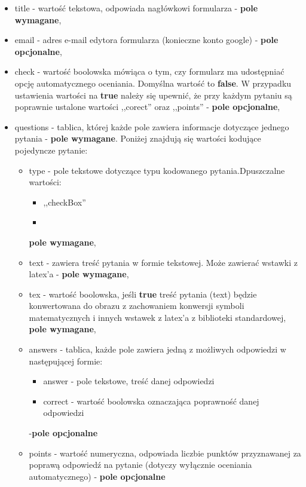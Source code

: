 \begin{itemize}
\item{title} - wartość tekstowa, odpowiada nagłówkowi formularza -  \textbf{pole wymagane},
\item{email} - adres e-mail edytora formularza (konieczne konto google) - \textbf{pole opcjonalne},
\item{check} - wartość boolowska mówiąca o tym, czy formularz ma udostępniać opcję automatycznego oceniania. Domyślna wartość to \textbf{false}. W przypadku ustawienia wartości na \textbf{true} należy się upewnić, że przy każdym pytaniu są poprawnie ustalone wartości ,,corect'' oraz ,,points'' - \textbf{pole opcjonalne},
\item{questions} - tablica, której każde pole zawiera informacje dotyczące jednego pytania - \textbf{pole wymagane}. Poniżej znajdują się wartości kodujące pojedyncze pytanie:
\begin{itemize}
\item{type} - pole tekstowe dotyczące typu kodowanego pytania.Dpuszczalne wartości:
\begin{itemize}
\item ,,checkBox''
\item
\end{itemize}
 \textbf{pole wymagane},
\item{text} - zawiera treść pytania w formie tekstowej. Może zawierać wstawki z latex'a - \textbf{pole wymagane},
\item{tex} - wartość boolowska, jeśli \textbf{true} treść pytania (text) będzie konwertowana do obrazu z zachowaniem konwersji symboli matematycznych i innych wstawek z latex'a z biblioteki standardowej, \textbf{pole wymagane},
\item{answers} - tablica, każde pole zawiera jedną z możliwych odpowiedzi w następującej formie:
\begin{itemize}
\item answer - pole tekstowe, treść danej odpowiedzi
\item correct - wartość boolowska oznaczająca poprawność danej odpowiedzi 
\end{itemize} 
-\textbf{pole opcjonalne}
\item{points} - wartość numeryczna, odpowiada liczbie punktów przyznawanej za poprawą odpowiedź na pytanie (dotyczy wyłącznie oceniania automatycznego) - \textbf{pole opcjonalne}
\end{itemize}
\end{itemize}









